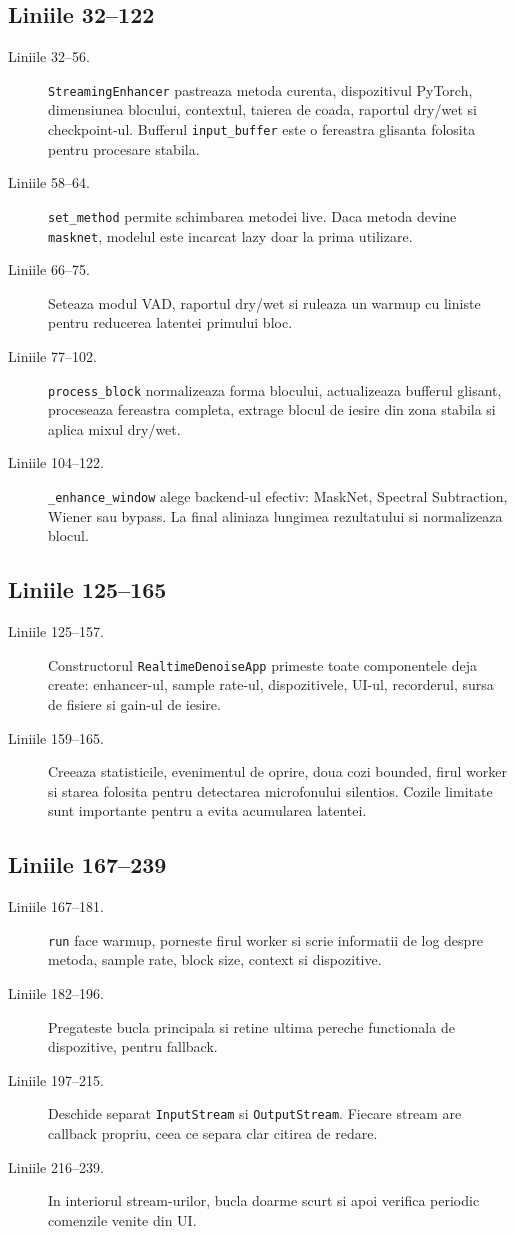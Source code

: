 \documentclass[12pt,a4paper]{report}
\newcommand{\chunk}[3]{\subsection*{Liniile #2--#3}}
\begin{document}
\chunk{../src/tools/realtime/engine.py}{32}{122}

\begin{description}
    \item[Liniile 32--56.] \texttt{StreamingEnhancer} pastreaza metoda curenta,
    dispozitivul PyTorch, dimensiunea blocului, contextul, taierea de coada,
    raportul dry/wet si checkpoint-ul. Bufferul \texttt{input\_buffer} este o
    fereastra glisanta folosita pentru procesare stabila.
    \item[Liniile 58--64.] \texttt{set\_method} permite schimbarea metodei live.
    Daca metoda devine \texttt{masknet}, modelul este incarcat lazy doar la prima
    utilizare.
    \item[Liniile 66--75.] Seteaza modul VAD, raportul dry/wet si ruleaza un
    warmup cu liniste pentru reducerea latentei primului bloc.
    \item[Liniile 77--102.] \texttt{process\_block} normalizeaza forma blocului,
    actualizeaza bufferul glisant, proceseaza fereastra completa, extrage blocul
    de iesire din zona stabila si aplica mixul dry/wet.
    \item[Liniile 104--122.] \texttt{\_enhance\_window} alege backend-ul efectiv:
    MaskNet, Spectral Subtraction, Wiener sau bypass. La final aliniaza lungimea
    rezultatului si normalizeaza blocul.
\end{description}

\chunk{../src/tools/realtime/engine.py}{125}{165}

\begin{description}
    \item[Liniile 125--157.] Constructorul \texttt{RealtimeDenoiseApp} primeste toate
    componentele deja create: enhancer-ul, sample rate-ul, dispozitivele, UI-ul,
    recorderul, sursa de fisiere si gain-ul de iesire.
    \item[Liniile 159--165.] Creeaza statisticile, evenimentul de oprire, doua cozi
    bounded, firul worker si starea folosita pentru detectarea microfonului
    silentios. Cozile limitate sunt importante pentru a evita acumularea latentei.
\end{description}

\chunk{../src/tools/realtime/engine.py}{167}{239}

\begin{description}
    \item[Liniile 167--181.] \texttt{run} face warmup, porneste firul worker si scrie
    informatii de log despre metoda, sample rate, block size, context si dispozitive.
    \item[Liniile 182--196.] Pregateste bucla principala si retine ultima pereche
    functionala de dispozitive, pentru fallback.
    \item[Liniile 197--215.] Deschide separat \texttt{InputStream} si \texttt{OutputStream}.
    Fiecare stream are callback propriu, ceea ce separa clar citirea de redare.
    \item[Liniile 216--239.] In interiorul stream-urilor, bucla doarme scurt si apoi
    verifica periodic comenzile venite din UI.
\end{description}
\end{document}
